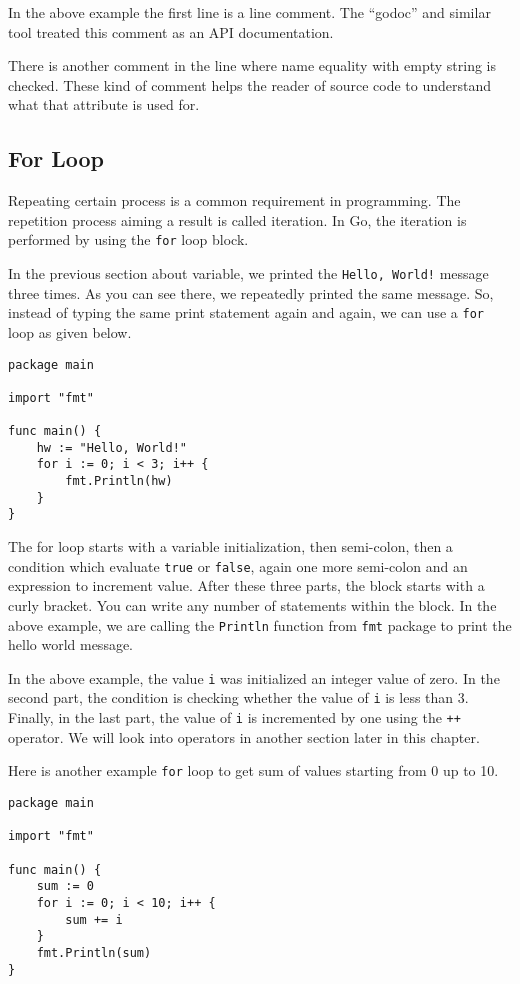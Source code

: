 In the above example the first line is a line comment.  The ``godoc''
and similar tool treated this comment as an API documentation.

There is another comment in the line where name equality with empty
string is checked.  These kind of comment helps the reader of
source code to understand what that attribute is used for.

\subsection{For Loop}

Repeating certain process is a common requirement in programming.  The
repetition process aiming a result is called iteration.  In Go, the
iteration is performed by using the \texttt{for} loop
block.

In the previous section about variable, we printed the \texttt{Hello,
World!}  message three times.  As you can see there, we repeatedly
printed the same message.  So, instead of typing the same print
statement again and again, we can use a \texttt{for} loop as given
below.

\begin{lstlisting}[numbers=none]
package main

import "fmt"

func main() {
    hw := "Hello, World!"
    for i := 0; i < 3; i++ {
        fmt.Println(hw)
    }
}
\end{lstlisting}

The for loop starts with a variable initialization, then semi-colon,
then a condition which evaluate \texttt{true} or \texttt{false}, again
one more semi-colon and an expression to increment value.  After these
three parts, the block starts with a curly bracket.  You can write any
number of statements within the block.  In the above example, we are
calling the \texttt{Println} function from \texttt{fmt} package to
print the hello world message.

In the above example, the value \texttt{i} was initialized an integer
value of zero.  In the second part, the condition is checking whether
the value of \texttt{i} is less than 3.  Finally, in the last part,
the value of \texttt{i} is incremented by one using the \texttt{++}
operator.  We will look into operators in another section later in
this chapter.

Here is another example \texttt{for} loop to get sum of values
starting from 0 up to 10.

\begin{lstlisting}[caption=For loop (sum.go)]
package main

import "fmt"

func main() {
    sum := 0
    for i := 0; i < 10; i++ {
        sum += i
    }
    fmt.Println(sum)
}
\end{lstlisting}

